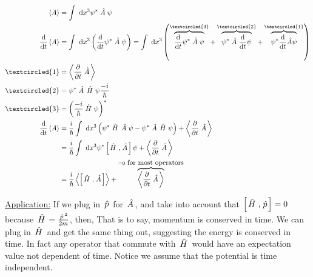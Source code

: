 \documentclass{school-22.101-notes}
\begin{document}
\begin{align}
\expect{A} &= \int \dx^3 \psi^* \Ahat \psi \\
\ddt \expect{A} &= \int \dx^3 \left( \ddt \psi^* \Ahat \psi \right) = \int \dx^3 \left( \overbrace{\ddt \psi^* \Ahat \psi}^{\textcircled{3}} + \overbrace{\psi^* \Ahat \ddt \psi}^{\textcircled{2}} + \overbrace{\psi^* \ddt \hat{A} \psi}^{\textcircled{1}} \right) \\
\textcircled{1} &= \expect{\ppt \Ahat} \\
\textcircled{2} &= \psi^* \Ahat \Hhat \psi \frac{-i}{\hbar}  \\
\textcircled{3} &= \left( \frac{-i}{\hbar}\Hhat \psi \right)^* \\
\ddt \expect{A} &= \frac{i}{\hbar} \int \dx^3 \left( \psi^* \Hhat \Ahat \psi  - \psi^* \Ahat \Hhat \psi \right) + \expect{\ppt \Ahat} \\
&= \frac{i}{\hbar} \int \dx^3 \psi^* \left[ \Hhat, \Ahat \right] \psi + \expect{\ppt \Ahat} \\
&= \frac{i}{\hbar} \expect{ \left[ \Hhat, \Ahat \right] } + \overbrace{\expect{\ppt \Ahat}}^{=0\mbox{ for most operators}} 
\end{align}

\uline{Application:} If we plug in $\left. \hat{p} \right.$ for $\left. \hat{A} \right.$, and take into account that $\left[ \left. \hat{H} \right., \left. \hat{p} \right. \right] = 0$ because $\left. \hat{H} \right. = \frac{\left. \hat{p} \right.^2}{2m}$, then,
That is to say, momentum is conserved in time. We can plug in $\left. \hat{H} \right.$ and get the same thing out, suggesting the energy is conserved in time. In fact any operator that commute with $\left. \hat{H} \right.$ would have an expectation value not dependent of time.  Notice we assume that the potential is time independent. 
\end{document}
